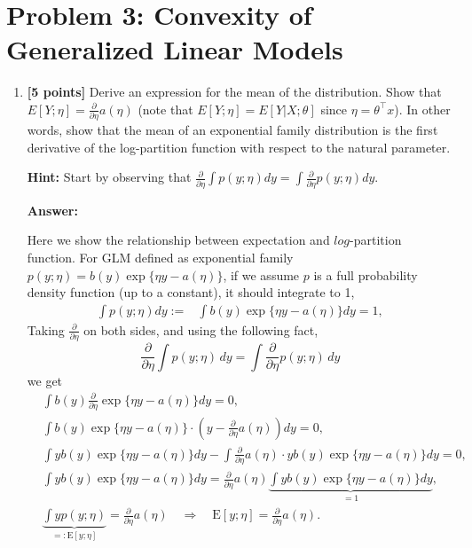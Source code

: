 \documentclass{article}
\begin{document}

\section*{Problem 3: Convexity of Generalized Linear Models}

\begin{enumerate}[label=\alph*)]
    \item \textbf{[5 points]} Derive an expression for the mean of the distribution. Show that $E[Y ; \eta] = \frac{\partial}{\partial \eta} a(\eta)$ (note that $E[Y ; \eta] = E[Y |X; \theta]$ since $\eta = \theta^\top x$). In other words, show that the mean of an exponential family distribution is the first derivative of the log-partition function with respect to the natural parameter.

\textbf{Hint:} Start by observing that $\frac{\partial}{\partial \eta} \int p(y; \eta) dy = \int \frac{\partial}{\partial \eta} p(y; \eta) dy$.

\textbf{Answer:}


    
    Here we show the relationship between expectation and $log$-partition function. For GLM defined as exponential family $p(y;\eta) = b(y) \exp\{\eta y - a(\eta)\}$, if we assume $p$ is a full probability density function (up to a constant), it should integrate to 1,
    \begin{align*}
        \int p(y;\eta) dy :=&\int b(y) \exp\{\eta y - a(\eta)\}dy = 1, 
    \end{align*}
Taking $\frac{\partial}{\partial\eta}$  on both sides, and using the following fact,
\[ \frac{\partial}{\partial \eta} \int p(y; \eta) \, dy = \int \frac{\partial}{\partial \eta} p(y; \eta) \, dy\]
we get
\begin{align*}
      & \int b(y) \frac{\partial}{\partial \eta}\exp\{\eta y - a(\eta)\}dy = 0,\\[8pt]
       &\int b(y)\exp\{\eta y - a(\eta)\}\cdot\left(y-\frac{\partial}{\partial \eta}a(\eta)\right)dy= 0,\\[8pt]
        & \int yb(y)\exp\{\eta y - a(\eta)\}dy -  \int\frac{\partial}{\partial \eta}a(\eta)\cdot yb(y)\exp\{\eta y - a(\eta)\}dy= 0,\\[8pt]
         & \int yb(y)\exp\{\eta y - a(\eta)\}dy = \frac{\partial}{\partial \eta}a(\eta)\underbrace{\int yb(y)\exp\{\eta y - a(\eta)\}dy}_{=1},\\[8pt]
          & \underbrace{\int yp(y;\eta)}_{=:\mathrm{E}[y;\eta]} =  \frac{\partial}{\partial \eta}a(\eta)\quad\Rightarrow\quad
        \boxed{\mathrm{E}[y;\eta]= \frac{\partial}{\partial \eta}a(\eta).}
    \end{align*}



\end{enumerate}
\end{document}
